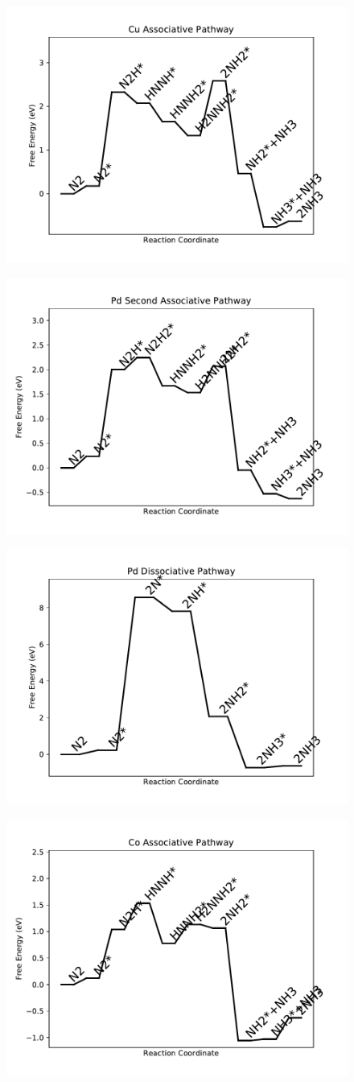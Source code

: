 \documentclass[journal=jacsat,manuscript=article]{achemso}
\begin{document}
\begin{figure}
\includegraphics[width=0.5\linewidth]{data/plots/Cu_associative.pdf}
\label{fig:Cu_associative}
\end{figure}

\begin{figure}
\includegraphics[width=0.5\linewidth]{data/plots/Pd_associative_2.pdf}
\label{fig:Pd_associative_2}
\end{figure}

\begin{figure}
\includegraphics[width=0.5\linewidth]{data/plots/Pd_dissociative.pdf}
\label{fig:Pd_dissociative}
\end{figure}

\begin{figure}
\includegraphics[width=0.5\linewidth]{data/plots/Co_associative.pdf}
\label{fig:Co_associative}
\end{figure}
\end{document}
